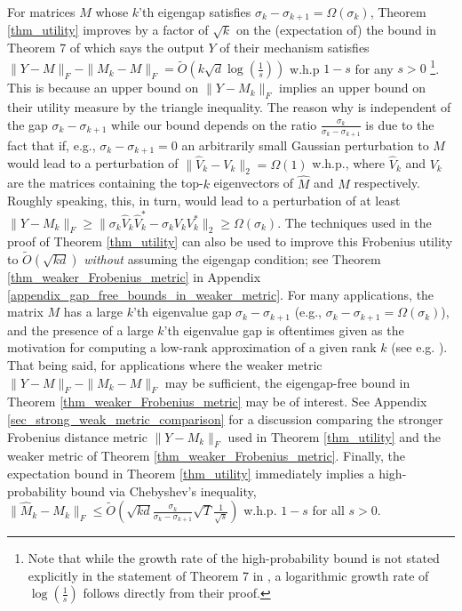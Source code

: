 \documentclass[11pt,letterpaper]{article}
\begin{document}
For matrices $M$ whose  $k$'th eigengap satisfies $\sigma_k - \sigma_{k+1} = \Omega(\sigma_k)$, Theorem \ref{thm_utility} improves by a factor of $\sqrt{k}$ on the (expectation of) the bound in Theorem 7 of \cite{dwork2014analyze} which says the output $Y$ of their mechanism satisfies  $\|Y - M\|_F - \|M_k - M\|_F = \tilde{O}(k\sqrt{d} \log(\frac{1}{s}))$ w.h.p $1-s$ for any $s>0$ \footnote{Note that while the growth rate of the high-probability bound is not stated explicitly in the statement of Theorem 7 in \cite{dwork2014analyze}, a logarithmic growth rate of $\log(\frac{1}{s})$ follows directly from their proof.}.
%
\color{black}
% 
This is because an upper bound on $\| Y - M_k\|_F$ implies an upper bound on their utility measure by the triangle inequality.
%
%
The reason why \cite{dwork2014analyze} is independent of the gap $\sigma_k - \sigma_{k+1}$ while our bound depends on the  ratio $\frac{\sigma_k}{\sigma_k -\sigma_{k+1}}$  is due to the fact that 
if, e.g., $\sigma_k - \sigma_{k+1} = 0$ an arbitrarily small Gaussian perturbation to $M$ would lead to a perturbation of $\|\hat{V}_k - V_k\|_2 =\Omega(1)$ w.h.p., where $\hat{V}_k$ and $V_k$ are the matrices containing the top-$k$ eigenvectors of $\hat{M}$ and $M$ respectively.
 Roughly speaking, this, in turn, would lead to a perturbation of at least $\|Y - M_k \|_F  \geq \|\sigma_k\hat{V}_k \hat{V}_k^\ast - \sigma_k V_k V_k^\ast\|_2 \geq \Omega(  \sigma_k)$.
%
The techniques used in the proof of Theorem \ref{thm_utility} can also be used to improve this Frobenius utility to $\tilde{O}(\sqrt{kd})$ {\em without} assuming the eigengap condition; see Theorem \ref{thm_weaker_Frobenius_metric} in  Appendix \ref{appendix_gap_free_bounds_in_weaker_metric}.
%
For many applications, the matrix $M$ has a large $k$'th eigenvalue gap $\sigma_{k}-\sigma_{k+1}$  (e.g., $\sigma_{k}-\sigma_{k+1} = \Omega(\sigma_{k})$), and the presence of a large $k$'th eigenvalue gap is oftentimes given as the motivation for computing a low-rank approximation of a given rank $k$ (see e.g. \cite{yu2015useful, zhang2020note,  von2007tutorial,  jolliffe2002choosing, halimi2016estimating}).
%
That being said, for applications where the weaker metric $\|Y - M\|_F - \|M_k - M\|_F$ may be sufficient, the eigengap-free bound in Theorem \ref{thm_weaker_Frobenius_metric} may be of interest. 
%
 See Appendix \ref{sec_strong_weak_metric_comparison} for a discussion comparing the stronger Frobenius distance metric $\| Y - M_k\|_F$ used in Theorem \ref{thm_utility} and the weaker metric of Theorem  \ref{thm_weaker_Frobenius_metric}. 
%
Finally, the expectation bound in Theorem \ref{thm_utility} immediately implies a high-probability bound via Chebyshev's inequality,  $\|\hat{M}_k - M_k \|_F \leq \tilde{O}(\sqrt{kd} \frac{\sigma_k}{\sigma_k - \sigma_{k+1}}  \sqrt{T}  \frac{1}{\sqrt{s}})$ w.h.p. $1-s$ for all $s>0$.
\end{document}
